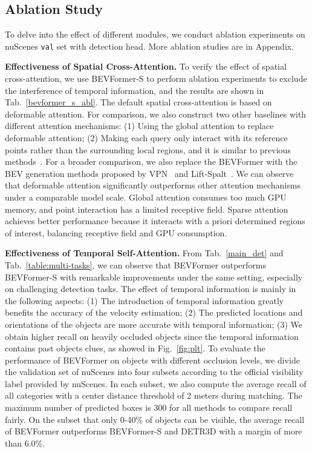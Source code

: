 \documentclass{article}
\begin{document}
\subsection{Ablation Study}


To delve into the effect of different modules, we conduct ablation experiments on nuScenes \texttt{val} set with detection head. More ablation studies are in Appendix.


\noindent\textbf{Effectiveness of Spatial Cross-Attention.}
To verify the effect of spatial cross-attention, we use BEVFormer-S to perform ablation experiments to exclude the interference of temporal information, and the results are shown in Tab.~\ref{bevformer_s_abl}.
The default spatial cross-attention is based on deformable attention.
For comparison, we also construct two other baselines with different attention mechanisms: (1)  Using the global attention to replace deformable attention; (2)  Making each query only interact with its reference points rather than the surrounding local regions, and it is similar to previous  methods~\cite{Roddick2019OrthographicFT,rukhovich2022imvoxelnet}. 
For a broader comparison, we also replace the BEVFormer  with the BEV generation methods proposed by VPN~\cite{pan2020cross} and Lift-Spalt~\cite{philion2020lift}. We can observe that deformable attention significantly outperforms other attention mechanisms under a comparable model scale. 
Global attention consumes too much GPU memory, and point interaction has a limited receptive field.  
Sparse attention achieves better performance because it interacts with a priori determined regions of interest, balancing receptive field and GPU consumption.


\noindent\textbf{Effectiveness of Temporal Self-Attention.} 
From Tab.~\ref{main_det} and Tab.~\ref{table:multi-tasks}, we can observe that BEVFormer outperforms BEVFormer-S with remarkable improvements under the same setting, especially on challenging detection tasks. The effect of temporal information is mainly in the following aspects: (1) The introduction of temporal information greatly benefits the accuracy of the  velocity estimation; (2) The predicted locations and orientations of the objects are more accurate with temporal information; (3) We obtain higher recall on heavily occluded objects since the temporal information contains past objects clues, as showed in Fig.~\ref{fig:plt}. 
To evaluate the performance of BEVFormer on objects with different occlusion levels, we divide the validation set of nuScenes into four subsets according to the official visibility label provided by nuScenes. In each subset, we also compute the average recall of all categories with a center distance threshold of 2 meters during matching. The maximum number of predicted boxes is 300 for all methods to compare recall fairly.
On the subset that only 0-40\% of objects can be visible, the average recall of BEVFormer outperforms BEVFormer-S and DETR3D with a margin of more than 6.0\%.
\end{document}
